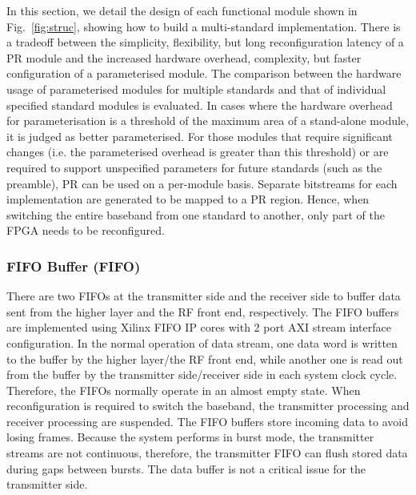 In this section, we detail the design of each functional module shown in Fig.~\ref{fig:struc}, showing how to build a multi-standard implementation.
There is a tradeoff between the simplicity, flexibility, but long reconfiguration latency of a PR module and the increased hardware overhead, complexity, but faster configuration of a parameterised module.
The comparison between the hardware usage of parameterised modules for multiple standards and that of individual specified standard modules is evaluated.
In cases where the hardware overhead for parameterisation is a threshold of the maximum area of a stand-alone module, it is judged as better parameterised.
For those modules that require significant changes (i.e. the parameterised overhead is greater than this threshold) or are required to support unspecified parameters for future standards (such as the preamble), PR can be used on a per-module basis.
Separate bitstreams for each implementation are generated to be mapped to a PR region.
Hence, when switching the entire baseband from one standard to another, only part of the FPGA needs to be reconfigured.

\subsubsection{FIFO Buffer (FIFO)}
There are two FIFOs at the transmitter side and the receiver side to buffer data sent from the higher layer and the RF front end, respectively.
The FIFO buffers are implemented using Xilinx FIFO IP cores with 2 port AXI stream interface configuration.
In the normal operation of data stream, one data word is written to the buffer by the higher layer/the RF front end, while another one is read out from the buffer by the transmitter side/receiver side in each system clock cycle.
Therefore, the FIFOs normally operate in an almost empty state.
When reconfiguration is required to switch the baseband, the transmitter processing and receiver processing are suspended.
The FIFO buffers store incoming data to avoid losing frames.
Because the system performs in burst mode, the transmitter streams are not continuous, therefore, the transmitter FIFO can flush stored data during  gaps between bursts.
The data buffer is not a critical issue for the transmitter side.

